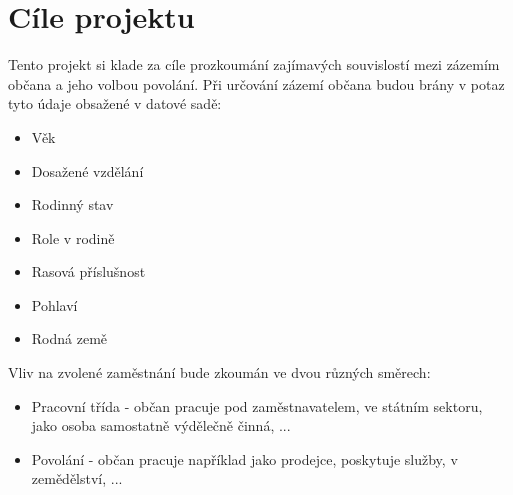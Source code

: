 \documentclass[11pt,a4paper,titlepage]{article}
\begin{document}
    \section{Cíle projektu\label{cile}}
    
    Tento projekt si klade za cíle prozkoumání zajímavých souvislostí mezi zázemím občana a jeho volbou povolání. Při určování zázemí občana budou brány v potaz tyto údaje obsažené v datové sadě:
    
    \begin{itemize}
    	\item Věk
		\item Dosažené vzdělání
		\item Rodinný stav
		\item Role v rodině
		\item Rasová příslušnost
		\item Pohlaví
		\item Rodná země
    \end{itemize}
    
    
	Vliv na zvolené zaměstnání bude zkoumán ve dvou různých směrech:
    \begin{itemize}
        \item Pracovní třída - občan pracuje pod zaměstnavatelem, ve státním sektoru, jako osoba samostatně výdělečně činná, ...
        \item Povolání - občan pracuje například jako prodejce, poskytuje služby, v zemědělství, ...
    \end{itemize}
\end{document}
